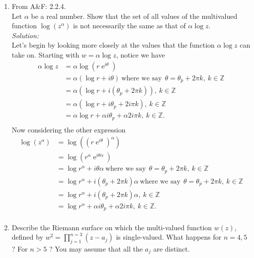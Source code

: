\documentclass[10pt]{amsart}
\DeclareMathOperator{\E}{e}
\theoremstyle{nonumberplain}
\begin{document}
\begin{enumerate}[label={\bf {\arabic*}:}]
\item From A\&F: 2.2.4. \\
Let $\alpha$ be a real number.
Show that the set of all values of the multivalued function $\log(z^\alpha)$ is not necessarily the same as that of $\alpha \log z$. \\
\textit{Solution:} \\
Let's begin by looking more closely at the values that the function $\alpha \log z$ can take on.
Starting with $w = \alpha \log z$, notice we have
\begin{align*}
\alpha \log z &= \alpha \log\left( r\E^{i\theta} \right) \\
		   &= \alpha \left(\log r + i\theta\right) \: \text{where we say} \:\: \theta = \theta_p + 2\pi k, \: k \in \mathbb{Z} \\
		   &= \alpha \left(\log r + i\left(\theta_p + 2\pi k\right)\right), \: k \in \mathbb{Z} \\
		   &= \alpha \left(\log r + i\theta_p + 2i\pi k \right), \: k \in \mathbb{Z} \\
		   &= \alpha \log r + \alpha i \theta_p + \alpha 2i\pi k, \: k \in \mathbb{Z}. \\
\end{align*}
Now considering the other expression
\begin{align*}
\log \left( z^\alpha \right) &= \log \left( \left(r\E^{i\theta}\right)^\alpha\right) \\
				     &= \log \left( r^\alpha \E^{i\theta\alpha}\right) \\
				     &= \log r^\alpha + i\theta\alpha  \: \text{where we say} \:\: \theta = \theta_p + 2\pi k, \: k \in \mathbb{Z} \\
				     &= \log r^\alpha + i\left(\theta_p + 2\pi k\right)\alpha  \: \text{where we say} \:\: \theta = \theta_p + 2\pi k, \: k \in \mathbb{Z} \\
				     &= \log r^\alpha + i\left(\theta_p + 2\pi k\right)\alpha, \: k \in \mathbb{Z} \\
				     &= \log r^\alpha + \alpha i \theta_p + \alpha 2i\pi k, \: k \in \mathbb{Z}. \\
\end{align*}
\item Describe the Riemann surface on which the multi-valued function
  $w(z)$, defined by $w^2=\prod_{j=1}^{n=3}\left(z-a_j\right)$ is
  single-valued. What happens for $n=4,5$ ? For $n>5$ ? You may assume
  that all the $a_j$ are distinct.\\

\end{enumerate}
\end{document}
